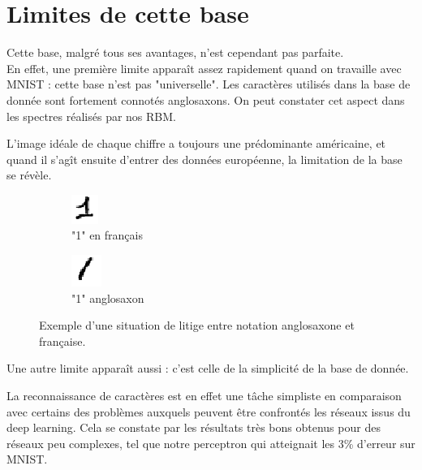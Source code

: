 \documentclass[a4paper,oneside]{report}
\begin{document}
            \section{Limites de cette base}

                Cette base, malgré tous ses avantages, n'est cependant pas parfaite.\\

                En effet, une première limite apparaît assez rapidement quand on travaille avec MNIST : cette base n'est pas "universelle". Les caractères utilisés dans la base de donnée sont fortement connotés anglosaxons. On peut constater cet aspect dans les spectres réalisés par nos RBM.

                L'image idéale de chaque chiffre a toujours une prédominante américaine, et quand il s'agît ensuite d'entrer des données européenne, la limitation de la base se révèle.\\

                \begin{figure}
                    \centering
                    \begin{subfigure}[b]{0.3\textwidth}
                        \centering
                        \includegraphics{Images/mnist-02.png}
                        \caption{"1" en français}
                    \end{subfigure}
                    \hfill
                    \begin{subfigure}[b]{0.3\textwidth}
                        \centering
                        \includegraphics{Images/mnist-03.png}
                        \caption{"1" anglosaxon}
                    \end{subfigure}
                    \caption{Exemple d'une situation de litige entre notation anglosaxone et française.}
                \end{figure}

                Une autre limite apparaît aussi : c'est celle de la simplicité de la base de donnée.

                La reconnaissance de caractères est en effet une tâche simpliste en comparaison avec certains des problèmes auxquels peuvent être confrontés les réseaux issus du deep learning. Cela se constate par les résultats très bons obtenus pour des réseaux peu complexes, tel que notre perceptron qui atteignait les 3\% d'erreur sur MNIST.
\end{document}
